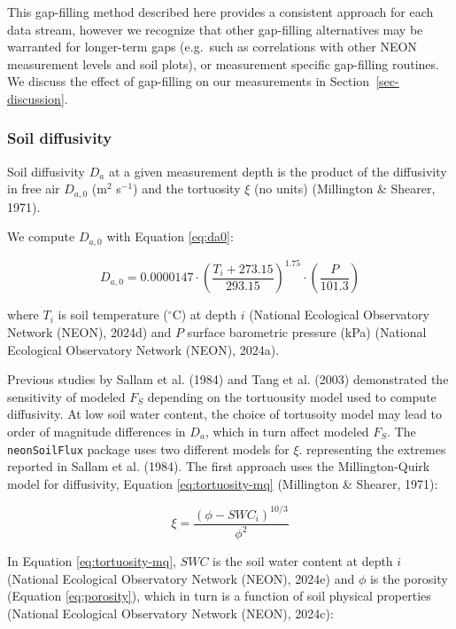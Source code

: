 \documentclass[
  letterpaper,
  DIV=11,
  numbers=noendperiod]{scrartcl}
\begin{document}
This gap-filling method described here provides a consistent approach
for each data stream, however we recognize that other gap-filling
alternatives may be warranted for longer-term gaps (e.g.~such as
correlations with other NEON measurement levels and soil plots), or
measurement specific gap-filling routines. We discuss the effect of
gap-filling on our measurements in Section~\ref{sec-discussion}.

\subsubsection{Soil diffusivity}\label{sec-compute-diffusivity}

Soil diffusivity \(D_{a}\) at a given measurement depth is the product
of the diffusivity in free air \(D_{a,0}\) (m\(^{2}\) s\(^{-1}\)) and
the tortuosity \(\xi\) (no units) (Millington \& Shearer, 1971).

We compute \(D_{a,0}\) with Equation \ref{eq:da0}:

\begin{equation}
  D_{a,0} = 0.0000147 \cdot \left( \frac{T_{i} + 273.15}{293.15} \right)^{1.75} \cdot \left( \frac{P}{101.3} \right)
  \label{eq:da0}
\end{equation}

where \(T_{i}\) is soil temperature (\(^\circ\)C) at depth \(i\)
(National Ecological Observatory Network (NEON), 2024d) and \(P\)
surface barometric pressure (kPa) (National Ecological Observatory
Network (NEON), 2024a).

Previous studies by Sallam et al. (1984) and Tang et al. (2003)
demonstrated the sensitivity of modeled \(F_{S}\) depending on the
tortuousity model used to compute diffusivity. At low soil water
content, the choice of tortusoity model may lead to order of magnitude
differences in \(D_{a}\), which in turn affect modeled \(F_{S}\). The
\texttt{neonSoilFlux} package uses two different models for \(\xi\).
representing the extremes reported in Sallam et al. (1984). The first
approach uses the Millington-Quirk model for diffusivity, Equation
\ref{eq:tortuosity-mq} (Millington \& Shearer, 1971):

\begin{equation}
  \xi = \frac{(\phi - SWC_{i})^{10/3}}{\phi^{2}}
  \label{eq:tortuosity-mq}
\end{equation}

In Equation \ref{eq:tortuosity-mq}, \(SWC\) is the soil water content at
depth \(i\) (National Ecological Observatory Network (NEON), 2024e) and
\(\phi\) is the porosity (Equation \ref{eq:porosity}), which in turn is
a function of soil physical properties (National Ecological Observatory
Network (NEON), 2024c):
\end{document}
